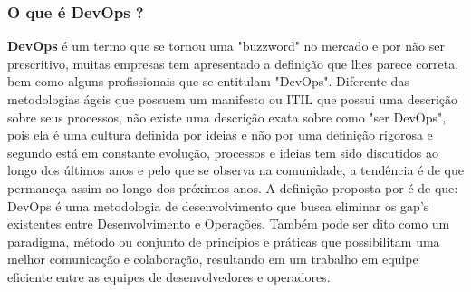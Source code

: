 \documentclass[twoside,english,brazilian]{UNISINOSartigo}
\begin{document}
\subsubsection{O que é DevOps ?}

\textbf{DevOps} é um termo que se tornou uma "buzzword" no mercado e  por não ser prescritivo, muitas empresas tem apresentado a definição que lhes parece correta, bem como alguns profissionais que se entitulam "DevOps". 
Diferente das metodologias ágeis que possuem um manifesto ou ITIL que possui uma descrição sobre seus processos, não existe uma descrição exata sobre como "ser DevOps", pois ela é uma cultura definida por ideias e não por uma definição rigorosa e segundo  está em constante evolução, processos e ideias tem sido discutidos ao longo dos últimos anos e pelo que se observa na comunidade, a tendência é de que permaneça assim ao longo dos próximos anos.  \newline 
A definição proposta por \citep{Jabbari2016} é de que: DevOps é uma metodologia de desenvolvimento que busca eliminar os gap's existentes entre Desenvolvimento e Operações. Também pode ser dito como um paradigma, método ou conjunto de princípios e práticas que possibilitam uma melhor comunicação e colaboração, resultando em um trabalho em equipe eficiente entre as equipes de desenvolvedores e operadores.
\end{document}

